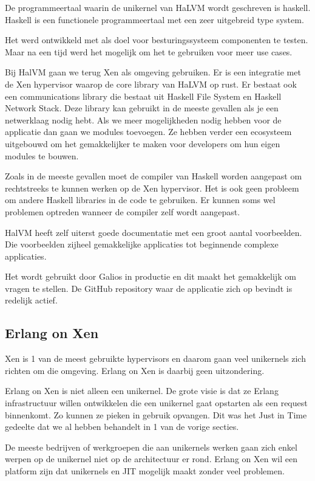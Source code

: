 \documentclass[pdftex,a4paper,12pt,twoside]{report}
\begin{document}
De programmeertaal waarin de unikernel van HaLVM wordt geschreven is haskell. Haskell is een functionele programmeertaal met een zeer uitgebreid type system.

Het werd ontwikkeld met als doel voor besturingssysteem componenten te testen. Maar na een tijd werd het mogelijk om het te gebruiken voor meer use cases.

Bij HalVM gaan we terug Xen als omgeving gebruiken. Er is een integratie met de Xen hypervisor waarop de core library van HaLVM op rust. Er bestaat ook een communications library die bestaat uit Haskell File System en Haskell Network Stack. Deze library kan gebruikt in de meeste gevallen als je een netwerklaag nodig hebt. Als we meer mogelijkheden nodig hebben voor de applicatie dan gaan we modules toevoegen. Ze hebben verder een ecosysteem uitgebouwd om het gemakkelijker te maken voor developers om hun eigen modules te bouwen. 

Zoals in de meeste gevallen moet de compiler van Haskell worden aangepast om rechtstreeks te kunnen werken op de Xen hypervisor. Het is ook geen probleem om andere Haskell libraries in de code te gebruiken. Er kunnen soms wel problemen optreden wanneer de compiler zelf wordt aangepast.

HalVM heeft zelf uiterst goede documentatie met een groot aantal voorbeelden. Die voorbeelden zijheel gemakkelijke applicaties tot beginnende complexe applicaties.

Het wordt gebruikt door Galios in productie en dit maakt het gemakkelijk om vragen te stellen. De GitHub repository waar de applicatie zich op bevindt is redelijk actief.

\subsection{Erlang on Xen}

Xen is 1 van de meest gebruikte hypervisors en daarom gaan veel unikernels zich richten om die omgeving. Erlang on Xen is daarbij geen uitzondering.

Erlang on Xen is niet alleen een unikernel. De grote visie is dat ze Erlang infrastructuur willen ontwikkelen die een unikernel gaat opstarten als een request binnenkomt. Zo kunnen ze pieken in gebruik opvangen. Dit was het Just in Time gedeelte dat we al hebben behandelt in 1 van de vorige secties.

De meeste bedrijven of werkgroepen die aan unikernels werken gaan zich enkel werpen op de unikernel niet op de architectuur er rond. Erlang on Xen wil een platform zijn dat unikernels en JIT mogelijk maakt zonder veel problemen.
\end{document}
